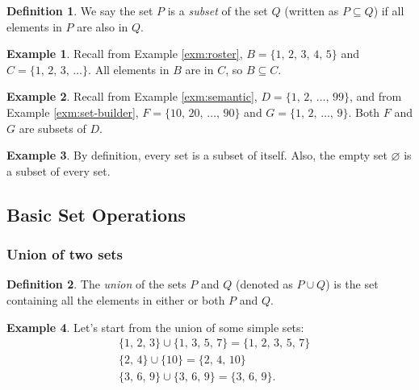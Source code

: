 \documentclass[
]{book}
\theoremstyle{definition}
\newtheorem{definition}{Definition}[chapter]
\theoremstyle{definition}
\newtheorem{example}{Example}[chapter]
\theoremstyle{definition}
\theoremstyle{definition}
\theoremstyle{remark}
\begin{document}
\begin{definition}
\protect\hypertarget{def:subset}{}\label{def:subset}We say the set \(P\) is a \emph{subset} of the set \(Q\) (written as \(P \subseteq Q\)) if all elements in \(P\) are also in \(Q\).
\end{definition}

\begin{example}
\protect\hypertarget{exm:subset1}{}\label{exm:subset1}Recall from Example \ref{exm:roster}, \(B = \{1,\, 2,\, 3,\, 4,\, 5\}\) and \(C = \{1,\, 2,\, 3,\, \dots\}\). All elements in \(B\) are in \(C\), so \(B \subseteq C\).
\end{example}

\begin{example}
\protect\hypertarget{exm:subset2}{}\label{exm:subset2}Recall from Example \ref{exm:semantic}, \(D = \{1,\, 2,\, \dots,\, 99\}\), and from Example \ref{exm:set-builder}, \(F = \{10,\, 20,\, \dots,\, 90\}\) and \(G = \{1,\, 2,\, \dots,\, 9\}\). Both \(F\) and \(G\) are subsets of \(D\).
\end{example}

\begin{example}
\protect\hypertarget{exm:subset3}{}\label{exm:subset3}By definition, every set is a subset of itself. Also, the empty set \(\varnothing\) is a subset of every set.
\end{example}

\hypertarget{basic-set-operations}{%
\subsection{Basic Set Operations}\label{basic-set-operations}}

\hypertarget{union-of-two-sets}{%
\subsubsection{Union of two sets}\label{union-of-two-sets}}

\begin{definition}
\protect\hypertarget{def:union}{}\label{def:union}The \emph{union} of the sets \(P\) and \(Q\) (denoted as \(P \cup Q\)) is the set containing all the elements in either or both \(P\) and \(Q\).
\end{definition}

\begin{example}
\protect\hypertarget{exm:union}{}\label{exm:union}Let's start from the union of some simple sets:
\begin{align*}
& \{1,\, 2,\, 3\} \cup \{1,\, 3,\, 5,\, 7\} = \{1,\, 2,\, 3,\, 5,\, 7\} \\
& \{2,\, 4\} \cup \{10\} = \{2,\, 4,\, 10\} \\
& \{3,\, 6,\, 9\} \cup \{3,\, 6,\, 9\} = \{3,\, 6,\, 9\} .
\end{align*}
\end{example}
\end{document}
